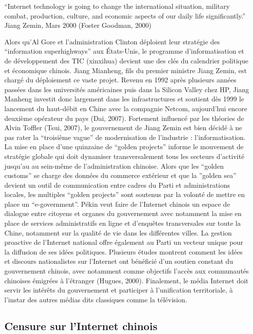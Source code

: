 “Internet technology is going to change the international situation, military 	combat, production, culture, and economic aspects of our daily life	significantly.”
Jiang Zemin, Mars 2000 (Foster  Goodman, 2000)

Alors qu’Al Gore et l’administration Clinton déploient leur stratégie des “information superhighways” aux États-Unis, le programme d’informatisation et de développement des TIC (xinxihua) devient une des clés du calendrier politique et économique chinois. Jiang Mianheng, fils du premier ministre Jiang Zemin, est chargé du déploiement ce vaste projet. Revenu en 1992 après plusieurs années passées dans les universités américaines puis dans la Silicon Valley chez HP, Jiang Manheng investit donc largement dans les infrastructures et soutient dès 1999 le lancement du haut-débit en Chine avec la compagnie Netcom, aujourd’hui encore deuxième opérateur du pays (Dai, 2007). Fortement influencé par les théories de Alvin Toffler (Tsui, 2007), le gouvernement de Jiang Zemin est bien décidé à ne pas rater la “troisième vague” de modernisation de l’industrie : l’informatisation. La mise en place d’une quinzaine de “golden projects” informe le mouvement de stratégie globale qui doit dynamiser transversalement tous les secteurs d’activité jusqu’au au sein-même de l’administration chinoise. Alors que les “golden customs” se charge des données du commerce extérieur et que la ”golden sea” devient un outil de communication entre cadres du Parti et administrations locales, les multiples “golden projects” sont soutenus par la volonté de mettre en place un “e-government”. Pékin veut faire de l’Internet chinois un espace de dialogue entre citoyens et organes du gouvernement avec notamment la mise en place de services administratifs en ligne et d’enquêtes transversales sur toute la Chine, notamment sur la qualité de vie dans les différentes villes. La gestion proactive de l’Internet national offre également au Parti un vecteur unique pour la diffusion de ses idées politiques. Plusieurs études montrent comment les idées et discours nationalistes sur l’Internet ont bénéficié d’un soutien constant du gouvernement chinois, avec notamment comme objectifs l’accès aux communautés chinoises émigrées à l’étranger (Hugues, 2000). Finalement, le média Internet doit servir les intérêts du gouvernement et participer à l’unification territoriale, à l’instar des autres médias dits classiques comme la télévision. 

\subsection[Censure sur l’Internet chinois]{Censure sur l’Internet chinois}

